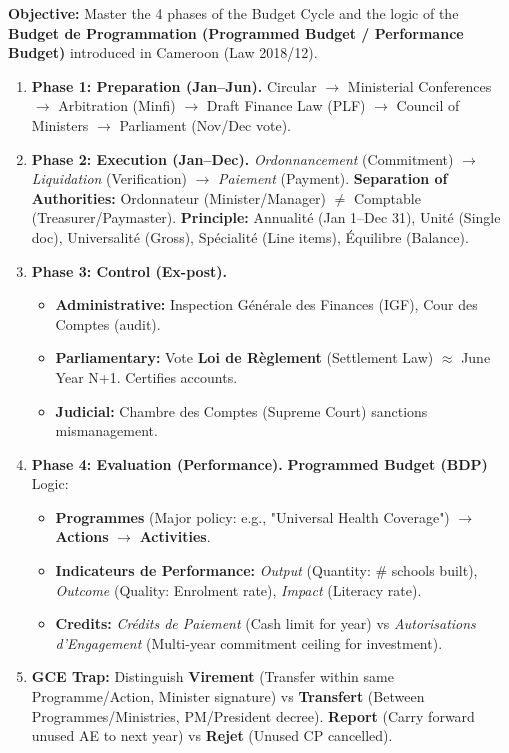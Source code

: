 \documentclass[11pt]{article}
\begin{document}
\begin{methode}
\textbf{Objective:} Master the 4 phases of the Budget Cycle and the logic of the \textbf{Budget de Programmation (Programmed Budget / Performance Budget)} introduced in Cameroon (Law 2018/12).
\begin{enumerate}
    \item \textbf{Phase 1: Preparation (Jan--Jun).} Circular $\rightarrow$ Ministerial Conferences $\rightarrow$ Arbitration (Minfi) $\rightarrow$ Draft Finance Law (PLF) $\rightarrow$ Council of Ministers $\rightarrow$ Parliament (Nov/Dec vote).
    \item \textbf{Phase 2: Execution (Jan--Dec).} \textit{Ordonnancement} (Commitment) $\rightarrow$ \textit{Liquidation} (Verification) $\rightarrow$ \textit{Paiement} (Payment). \textbf{Separation of Authorities:} Ordonnateur (Minister/Manager) $\neq$ Comptable (Treasurer/Paymaster). \textbf{Principle:} Annualité (Jan 1--Dec 31), Unité (Single doc), Universalité (Gross), Spécialité (Line items), Équilibre (Balance).
    \item \textbf{Phase 3: Control (Ex-post).} 
    \begin{itemize}
        \item \textbf{Administrative:} Inspection Générale des Finances (IGF), Cour des Comptes (audit).
        \item \textbf{Parliamentary:} Vote \textbf{Loi de Règlement} (Settlement Law) $\approx$ June Year N+1. Certifies accounts.
        \item \textbf{Judicial:} Chambre des Comptes (Supreme Court) sanctions mismanagement.
    \end{itemize}
    \item \textbf{Phase 4: Evaluation (Performance).} \textbf{Programmed Budget (BDP)} Logic:
    \begin{itemize}
        \item \textbf{Programmes} (Major policy: e.g., "Universal Health Coverage") $\rightarrow$ \textbf{Actions} $\rightarrow$ \textbf{Activities}.
        \item \textbf{Indicateurs de Performance:} \textit{Output} (Quantity: \# schools built), \textit{Outcome} (Quality: Enrolment rate), \textit{Impact} (Literacy rate).
        \item \textbf{Credits:} \textit{Crédits de Paiement} (Cash limit for year) vs \textit{Autorisations d'Engagement} (Multi-year commitment ceiling for investment).
    \end{itemize}
    \item \textbf{GCE Trap:} Distinguish \textbf{Virement} (Transfer within same Programme/Action, Minister signature) vs \textbf{Transfert} (Between Programmes/Ministries, PM/President decree). \textbf{Report} (Carry forward unused AE to next year) vs \textbf{Rejet} (Unused CP cancelled).
\end{enumerate}
\end{methode}
\end{document}

